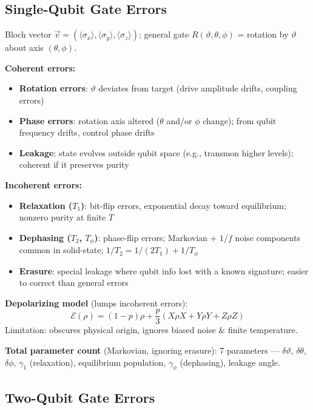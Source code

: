 \documentclass[10pt,a4paper]{article}
\begin{document}
\subsection{Single-Qubit Gate Errors}

Bloch vector $\vec{v} = (\langle\sigma_x\rangle, \langle\sigma_y\rangle, \langle\sigma_z\rangle)$; general gate $R(\vartheta, \theta, \phi)$ = rotation by $\vartheta$ about axis $(\theta,\phi)$.

\textcolor{alertred}{\textbf{Coherent errors:}}
\begin{itemize}
  \item \textbf{Rotation errors}: $\vartheta$ deviates from target (drive amplitude drifts, coupling errors)
  \item \textbf{Phase errors}: rotation axis altered ($\theta$ and/or $\phi$ change); from qubit frequency drifts, control phase drifts
  \item \textbf{Leakage}: state evolves outside qubit space (e.g., transmon higher levels); coherent if it preserves purity
\end{itemize}

\textcolor{deepblue}{\textbf{Incoherent errors:}}
\begin{itemize}
  \item \textbf{Relaxation ($T_1$)}: bit-flip errors, exponential decay toward equilibrium; nonzero purity at finite $T$
  \item \textbf{Dephasing ($T_2$, $T_\phi$)}: phase-flip errors; Markovian + $1/f$ noise components common in solid-state; $1/T_2 = 1/(2T_1) + 1/T_\phi$
  \item \textbf{Erasure}: special leakage where qubit info lost with a known signature; easier to correct than general errors
\end{itemize}

\textcolor{mathpurple}{\textbf{Depolarizing model}} (lumps incoherent errors):
\begin{equation}
  \mathcal{E}(\rho) = (1-p)\rho + \frac{p}{3}(X\rho X + Y\rho Y + Z\rho Z)
\end{equation}
\textcolor{alertred}{Limitation}: obscures physical origin, ignores biased noise \& finite temperature.

\textbf{Total parameter count} (Markovian, ignoring erasure): \textcolor{alertred}{7 parameters} --- $\delta\vartheta$, $\delta\theta$, $\delta\phi$, $\gamma_1$ (relaxation), equilibrium population, $\gamma_\phi$ (dephasing), leakage angle.

\subsection{Two-Qubit Gate Errors}
\end{document}
